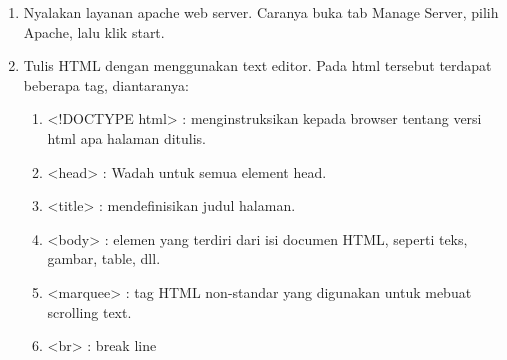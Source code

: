 \documentclass[a4paper,12pt]{article}
\begin{document}
\begin{enumerate}
    \item 
        \begin{minipage}[t]{\linewidth}
              \raggedright

              \medskip
              Nyalakan layanan apache web server. Caranya buka tab Manage Server, pilih Apache, lalu klik start.
        \end{minipage}

    \item 
        \begin{minipage}[t]{\linewidth}
              \raggedright

              \medskip
              Tulis HTML dengan menggunakan text editor. Pada html tersebut terdapat beberapa tag, diantaranya:\\
              \begin{enumerate}
                  \item <!DOCTYPE html> : menginstruksikan kepada browser tentang versi html apa halaman ditulis.
                  \item <head> : Wadah untuk semua element head.
                  \item <title> : mendefinisikan judul halaman.
                  \item <body> : elemen yang terdiri dari isi documen HTML, seperti teks, gambar, table, dll.
                  \item <marquee> : tag HTML non-standar yang digunakan untuk mebuat scrolling text.
                  \item <br> : break line
              \end{enumerate}
        \end{minipage}


\end{enumerate}
\end{document}
